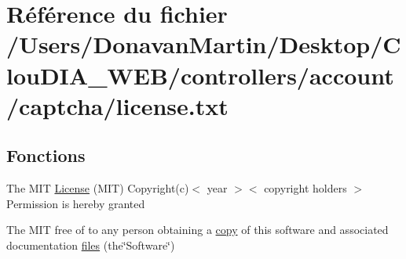 \hypertarget{license_8txt}{}\section{Référence du fichier /\+Users/\+Donavan\+Martin/\+Desktop/\+Clou\+D\+I\+A\+\_\+\+W\+E\+B/controllers/account/captcha/license.txt}
\label{license_8txt}
\subsection*{Fonctions}
\begin{DoxyCompactItemize}
\item 
The M\+I\+T \hyperlink{license_8txt_aa351fc599b259c77f418fde44928fdca}{License} (M\+I\+T) Copyright(c)$<$ year $>$$<$ copyright holders $>$ Permission is hereby granted
\item 
The M\+I\+T free of to any person obtaining a \hyperlink{license_8txt_aff1d4c6b756ebf691fa44a0904f68658}{copy} of this software and associated documentation \hyperlink{license_8txt_abdb4f4971cf029244bb81834ee9b393d}{files} (the\char`\"{}Software\char`\"{})
\end{DoxyCompactItemize}
